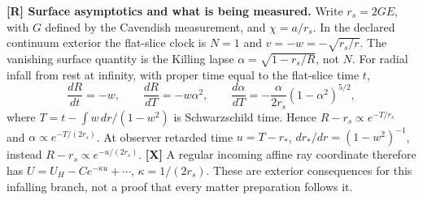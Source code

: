 \noindent\textbf{[R] Surface asymptotics and what is being measured.}
Write $r_s=2GE$, with $G$ defined by the Cavendish measurement, and
$\chi=a/r_s$.  In the declared continuum exterior the flat-slice clock is $N=1$
and $v=-w=-\sqrt{r_s/r}$.  The vanishing surface quantity is the Killing
lapse $\alpha=\sqrt{1-r_s/R}$, not $N$.  For radial infall from rest at
infinity, with proper time equal to the flat-slice time $t$,
\[
 \frac{dR}{dt}=-w,\qquad
 \frac{dR}{dT}=-w\alpha^2,\qquad
 \frac{d\alpha}{dT}=-\frac{\alpha}{2r_s}(1-\alpha^2)^{5/2},
\]
where $T=t-\int w\,dr/(1-w^2)$ is Schwarzschild time.
Hence $R-r_s\propto e^{-T/r_s}$ and
$\alpha\propto e^{-T/(2r_s)}$.  At observer retarded time
$u=T-r_*$, $dr_*/dr=(1-w^2)^{-1}$, instead
$R-r_s\propto e^{-u/(2r_s)}$.  \textbf{[X]} A regular incoming affine ray coordinate
therefore has $U=U_H-Ce^{-\kappa u}+\cdots$, $\kappa=1/(2r_s)$.
These are exterior consequences for this infalling branch, not a proof
that every matter preparation follows it.

